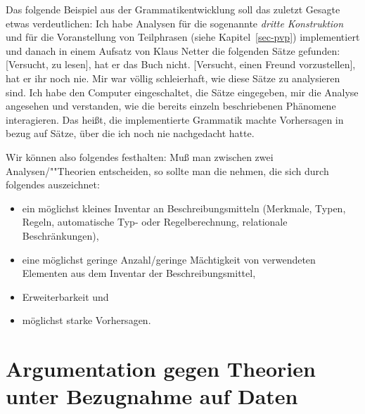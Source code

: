 Das folgende Beispiel aus der Grammatikentwicklung soll das zuletzt Gesagte etwas verdeutlichen:
Ich habe Analysen für die sogenannte \emph{dritte Konstruktion} und für die Voranstellung von Teilphrasen
(siehe Kapitel~\ref{sec-pvp}) implementiert und 
danach in einem Aufsatz von Klaus Netter \citeyearpar{Netter91} die folgenden Sätze gefunden:
\eal
\ex {}[Versucht, zu lesen], hat er das Buch nicht.
\ex {}[Versucht, einen Freund vorzustellen], hat er ihr noch nie.
\zl
Mir war völlig schleierhaft, wie diese Sätze zu analysieren sind. Ich habe den Computer eingeschaltet,
die Sätze eingegeben, mir die Analyse angesehen und verstanden, wie die bereits einzeln beschriebenen
Phänomene interagieren. Das heißt, die implementierte Grammatik machte Vorhersagen in bezug auf
Sätze, über die ich noch nie nachgedacht hatte.

Wir können also folgendes festhalten:
Muß man zwischen zwei Analysen/""Theorien entscheiden, so sollte man die nehmen, die sich durch folgendes
auszeichnet:
\begin{itemize}
\item ein möglichst kleines Inventar an Beschreibungsmitteln (Merkmale, Typen, Regeln, 
      automatische Typ- oder Regelberechnung, relationale Beschränkungen),
\item eine möglichst geringe Anzahl/geringe Mächtigkeit von verwendeten Elementen 
      aus dem Inventar der Beschreibungsmittel,
\item Erweiterbarkeit und
\item möglichst starke Vorhersagen.
\end{itemize}


\section{Argumentation gegen Theorien unter Bezugnahme auf Daten}

